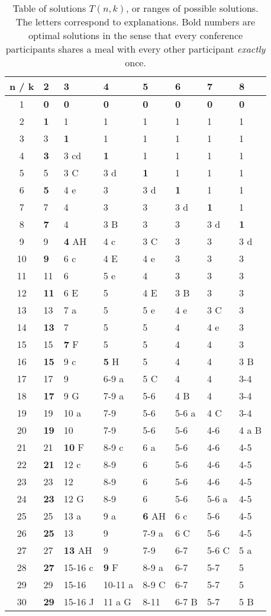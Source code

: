 \documentclass[a4paper]{article}
\begin{document}
\begin{table}
  \centering
\begin{tabular}{@{}c|lllllll@{}}
n / k & 2 & 3 & 4 & 5 & 6 & 7 & 8\tabularnewline
\hline
1 & \textbf{0} & \textbf{0} & \textbf{0} & \textbf{0} & \textbf{0} &
\textbf{0} & \textbf{0}\tabularnewline
2 & \textbf{1} & 1 & 1 & 1 & 1 & 1 & 1\tabularnewline
3 & 3 & \textbf{1} & 1 & 1 & 1 & 1 & 1\tabularnewline
4 & \textbf{3} & 3 cd & \textbf{1} & 1 & 1 & 1 & 1\tabularnewline
5 & 5 & 3 C & 3 d & \textbf{1} & 1 & 1 & 1\tabularnewline
6 & \textbf{5} & 4 e & 3 & 3 d & \textbf{1} & 1 & 1\tabularnewline
7 & 7 & 4 & 3 & 3 & 3 d & \textbf{1} & 1\tabularnewline
8 & \textbf{7} & 4 & 3 B & 3 & 3 & 3 d & \textbf{1}\tabularnewline
9 & 9 & \textbf{4} AH & 4 c & 3 C & 3 & 3 & 3 d\tabularnewline
10 & \textbf{9} & 6 c & 4 E & 4 e & 3 & 3 & 3\tabularnewline
11 & 11 & 6 & 5 e & 4 & 3 & 3 & 3\tabularnewline
12 & \textbf{11} & 6 E & 5 & 4 E & 3 B & 3 & 3\tabularnewline
13 & 13 & 7 a & 5 & 5 e & 4 e & 3 C & 3\tabularnewline
14 & \textbf{13} & 7 & 5 & 5 & 4 & 4 e & 3\tabularnewline
15 & 15 & \textbf{7} F & 5 & 5 & 4 & 4 & 3\tabularnewline
16 & \textbf{15} & 9 c & \textbf{5} H & 5 & 4 & 4 & 3 B\tabularnewline
17 & 17 & 9 & 6-9 a & 5 C & 4 & 4 & 3-4\tabularnewline
18 & \textbf{17} & 9 G & 7-9 a & 5-6 & 4 B & 4 & 3-4\tabularnewline
19 & 19 & 10 a & 7-9 & 5-6 & 5-6 a & 4 C & 3-4\tabularnewline
20 & \textbf{19} & 10 & 7-9 & 5-6 & 5-6 & 4-6 & 4 a B\tabularnewline
21 & 21 & \textbf{10} F & 8-9 c & 6 a & 5-6 & 4-6 & 4-5\tabularnewline
22 & \textbf{21} & 12 c & 8-9 & 6 & 5-6 & 4-6 & 4-5\tabularnewline
23 & 23 & 12 & 8-9 & 6 & 5-6 & 4-6 & 4-5\tabularnewline
24 & \textbf{23} & 12 G & 8-9 & 6 & 5-6 & 5-6 a & 4-5\tabularnewline
25 & 25 & 13 a & 9 a & \textbf{6} AH & 6 c & 5-6 & 4-5\tabularnewline
26 & \textbf{25} & 13 & 9 & 7-9 a & 6 C & 5-6 & 4-5\tabularnewline
27 & 27 & \textbf{13} AH & 9 & 7-9 & 6-7 & 5-6 C & 5 a\tabularnewline
28 & \textbf{27} & 15-16 c & \textbf{9} F & 8-9 a & 6-7 & 5-7 &
5\tabularnewline
29 & 29 & 15-16 & 10-11 a & 8-9 C & 6-7 & 5-7 & 5\tabularnewline
30 & \textbf{29} & 15-16 J & 11 a G & 8-11 & 6-7 B & 5-7 & 5
B\tabularnewline
\end{tabular}
\caption{Table of solutions $T(n,k)$, or ranges of possible
  solutions.  The letters correspond to explanations.  Bold numbers
  are optimal solutions in the sense that every conference
  participants shares a meal with every other participant
  \emph{exactly} once.}
\label{tab:dagstuhl}
\end{table}
\end{document}
